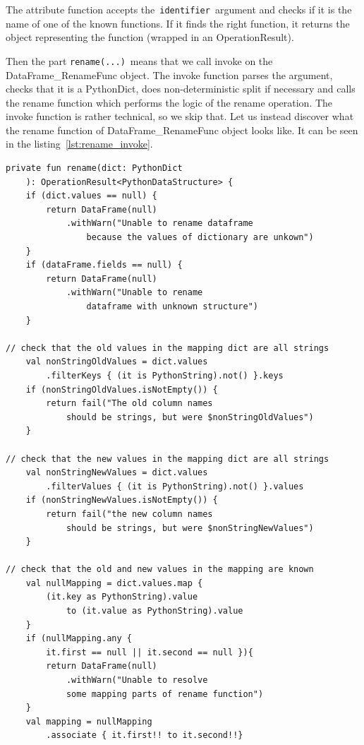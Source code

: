 The attribute function accepts the~\verb|identifier|~argument and checks if it is the name of one of the known functions.
If it finds the right function, it returns the object representing the function (wrapped in an OperationResult).

Then the part \verb|rename(...)|~means that we call invoke on the \\ DataFrame\_RenameFunc object.
The invoke function parses the argument, checks that it is a PythonDict, does non-deterministic split if necessary and
calls the rename function which performs the logic of the rename operation.
The invoke function is rather technical, so we skip that.
Let us instead discover what the rename function of DataFrame\_RenameFunc object looks like.
It can be seen in the listing~\ref{lst:rename_invoke}.

\begin{lstlisting}[caption=The rename function of DataFrame\_RenameFunc, label={lst:rename_invoke}, captionpos=b]
private fun rename(dict: PythonDict
    ): OperationResult<PythonDataStructure> {
    if (dict.values == null) {
        return DataFrame(null)
            .withWarn("Unable to rename dataframe
                because the values of dictionary are unkown")
    }
    if (dataFrame.fields == null) {
        return DataFrame(null)
            .withWarn("Unable to rename
                dataframe with unknown structure")
    }

// check that the old values in the mapping dict are all strings
    val nonStringOldValues = dict.values
        .filterKeys { (it is PythonString).not() }.keys
    if (nonStringOldValues.isNotEmpty()) {
        return fail("The old column names
            should be strings, but were $nonStringOldValues")
    }

// check that the new values in the mapping dict are all strings
    val nonStringNewValues = dict.values
        .filterValues { (it is PythonString).not() }.values
    if (nonStringNewValues.isNotEmpty()) {
        return fail("the new column names
            should be strings, but were $nonStringNewValues")
    }

// check that the old and new values in the mapping are known
    val nullMapping = dict.values.map {
        (it.key as PythonString).value
            to (it.value as PythonString).value
    }
    if (nullMapping.any {
        it.first == null || it.second == null }){
        return DataFrame(null)
            .withWarn("Unable to resolve
            some mapping parts of rename function")
    }
    val mapping = nullMapping
        .associate { it.first!! to it.second!!}


\end{lstlisting}
